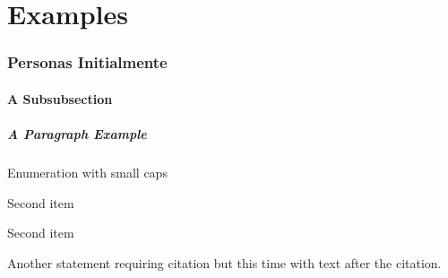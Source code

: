 
\chapter{Examples} %

\label{ch:examples} %



\subsection{Personas Initialmente}

\lipsum[10]

\subsubsection{A Subsubsection}
\lipsum[11]

\paragraph{A Paragraph Example} \lipsum[12]

\begin{aenumerate}
\item Enumeration with small caps
\item Second item
\item Second item
\end{aenumerate}

\noindent Another statement requiring citation \cite{sommerville:1992} \cite{sommerville:1992} but this time with text after the citation.


